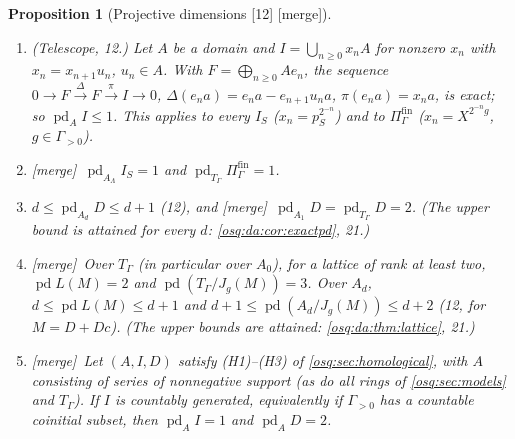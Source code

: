\documentclass[11pt,letterpaper]{article}
\numberwithin{equation}{section}
\newtheorem{proposition}[proposition]{Proposition}
\theoremstyle{definition}
\theoremstyle{remark}
\theoremstyle{plain}
\newcommand{\pd}{\operatorname{pd}}
\newcommand{\src}[1]{\textup{\textsf{[#1]}}}
\newcommand{\merge}{\textup{\textsf{[merge]}}}
\begin{document}
\begin{proposition}[Projective dimensions \src{12} \merge]\label{osq:hd:prop:pd}
\leavevmode
\begin{enumerate}
\item \emph{(Telescope, 12.)} Let $A$ be a domain and $I=\bigcup_{n\ge0}x_nA$ for nonzero $x_n$ with $x_n=x_{n+1}u_n$,
$u_n\in A$. With $F=\bigoplus_{n\ge0}Ae_n$, the sequence
$0\to F\xrightarrow{\Delta}F\xrightarrow{\pi}I\to0$, $\Delta(e_na)=e_na-e_{n+1}u_na$, $\pi(e_na)=x_na$, is exact; so $\pd_AI\le1$.
This applies to every $I_S$ ($x_n=p_S^{2^{-n}}$) and to $\Pi^{\mathrm{fin}}_\Gamma$ ($x_n=X^{2^{-n}g}$, $g\in\Gamma_{>0}$).
\item \merge\ $\pd_{A_\Lambda}I_S=1$ and $\pd_{T_\Gamma}\Pi^{\mathrm{fin}}_\Gamma=1$.
\item $d\le\pd_{A_d}D\le d+1$ (12), and \merge\ $\pd_{A_1}D=\pd_{T_\Gamma}D=2$. (The upper bound is attained for every $d$:
\cref{osq:da:cor:exactpd}, 21.)
\item \merge\ Over $T_\Gamma$ (in particular over $A_0$), for a lattice of rank at least two, $\pd L(M)=2$ and
$\pd(T_\Gamma/J_g(M))=3$. Over $A_d$, $d\le\pd L(M)\le d+1$ and $d+1\le\pd(A_d/J_g(M))\le d+2$ (12, for $M=D+Dc$). (The upper
bounds are attained: \cref{osq:da:thm:lattice}, 21.)
\item \merge\ Let $(A,I,D)$ satisfy (H1)--(H3) of \cref{osq:sec:homological}, with $A$ consisting of series of nonnegative
support (as do all rings of \cref{osq:sec:models} and $T_\Gamma$). If $I$ is countably generated, equivalently if $\Gamma_{>0}$ has a
countable coinitial subset, then $\pd_AI=1$ and $\pd_AD=2$.
\end{enumerate}
\end{proposition}
\end{document}
